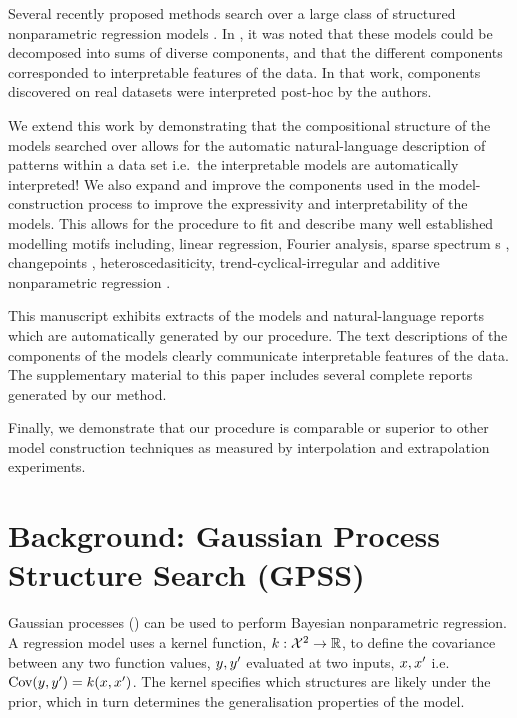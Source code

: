 \documentclass{article}
\def\ie{i.e.\ }
\begin{document}
Several recently proposed methods search over a large class of structured nonparametric regression models \citep[e.g.][]{DuvLloGroetal13, kronberger2013evolution, diosan2007evolving, bing2010gp}.
In \cite{DuvLloGroetal13}, it was noted that these models could be decomposed into sums of diverse components, and that the different components corresponded to interpretable features of the data.
In that work, components discovered on real datasets were interpreted post-hoc by the authors.

We extend this work by demonstrating that the compositional structure of the models searched over allows for the automatic natural-language description of patterns within a data set \ie the interpretable models are automatically interpreted!
We also expand and improve the components used in the model-construction process to improve the expressivity and interpretability of the models.
This allows for the procedure to fit and describe many well established modelling motifs including, linear regression, Fourier analysis, sparse spectrum \gp{}s \citep{lazaro2010sparse}, changepoints \citep[e.g.][]{garnett2010sequential, FoxDunson:NIPS2012}, heteroscedasiticity, trend-cyclical-irregular \citep[e.g.][]{lind2006basic} and additive nonparametric regression \citep[e.g.][]{buja1989linear}.

This manuscript exhibits extracts of the models and natural-language reports which are automatically generated by our procedure.
The text descriptions of the components of the models clearly communicate interpretable features of the data.
The supplementary material to this paper includes several complete reports generated by our method.

Finally, we demonstrate that our procedure is comparable or superior to other model construction techniques as measured by interpolation and extrapolation experiments.

\section{Background: Gaussian Process Structure Search (GPSS)}
\label{sec:gpss}

Gaussian processes (\gp{}) \citep{rasmussen38gaussian} can be used to perform Bayesian nonparametric regression.
A \gp{} regression model uses a kernel function, ${k : \mathcal{X}^2 \to \mathbb{R}}$, to define the covariance between any two function values, $y, y'$ evaluated at two inputs, $x,x'$ \ie ${\textrm{Cov}(y, y') = k(x,x')}$.
The kernel specifies which structures are likely under the \gp{} prior, which in turn determines the generalisation properties of the model.
\end{document}

